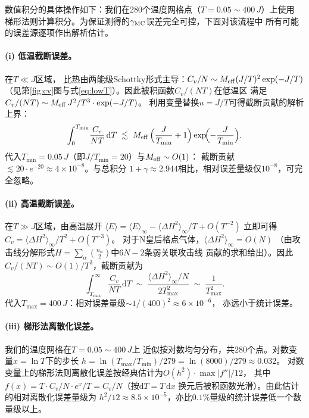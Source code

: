 数值积分的具体操作如下：我们在280个温度网格点（$T=0.05\sim400\,J$）上使用
梯形法则计算积分。为保证测得的$\gamma_{\rm MC}$误差完全可控，下面对该流程中
所有可能的误差源逐项作出解析估计。

\paragraph{(i) 低温截断误差。}在$T\ll J$区域，
比热由两能级Schottky形式主导：$C_{v}/N\sim M_{\rm eff}(J/T)^{2}\exp(-J/T)$
（见第\ref{fig:cv}图与式\ref{eq:lowT}）。因此被积函数$C_{v}/(NT)$在低温区
满足$C_{v}/(NT)\sim M_{\rm eff}\,J^{2}/T^{3}\cdot\exp(-J/T)$。
利用变量替换$u=J/T$可得截断贡献的解析上界：
%
\begin{equation}
  \int_{0}^{T_{\min}}\!\frac{C_{v}}{NT}\,\mathrm{d}T
  \;\lesssim\; M_{\rm eff}\,\Bigl(\frac{J}{T_{\min}}+1\Bigr)\exp\!\Bigl(-\frac{J}{T_{\min}}\Bigr).
\end{equation}
%
代入$T_{\min}=0.05\,J$（即$J/T_{\min}=20$）与$M_{\rm eff}\sim O(1)$：
截断贡献$\lesssim 20\cdot e^{-20}\approx 4\times 10^{-8}$。与总积分
$1+\gamma\approx 2.944$相比，相对误差量级仅$10^{-8}$，可完全忽略。

\paragraph{(ii) 高温截断误差。}在$T\gg J$区域，由高温展开
$\langle E\rangle = \langle E\rangle_{\infty} - \langle\Delta H^{2}\rangle_{\infty}/T+O(T^{-2})$
立即可得$C_{v}=\langle\Delta H^{2}\rangle_{\infty}/T^{2}+O(T^{-3})$。
对于N皇后格点气体，$\langle\Delta H^{2}\rangle_{\infty}=O(N)$
（由攻击线分解形式$H=\sum_{\alpha}\binom{n_{\alpha}}{2}$中$6N-2$条弱关联攻击线
贡献的求和给出）。因此$C_{v}/(NT)\sim O(1)/T^{3}$，截断贡献为
%
\begin{equation}
  \int_{T_{\max}}^{\infty}\!\frac{C_{v}}{NT}\,\mathrm{d}T
  \;\sim\;\frac{\langle\Delta H^{2}\rangle_{\infty}/N}{2T_{\max}^{2}}
  \;\sim\;\frac{1}{T_{\max}^{2}}.
\end{equation}
%
代入$T_{\max}=400\,J$：相对误差量级$\sim 1/(400)^{2}\approx 6\times 10^{-6}$，
亦远小于统计误差。

\paragraph{(iii) 梯形法离散化误差。}我们的温度网格在$T=0.05\sim 400\,J$上
近似按对数均匀分布，共$280$个点。对数变量$x=\ln T$下的步长
$h=\ln(T_{\max}/T_{\min})/279=\ln(8000)/279\approx 0.032$。
对数变量上的梯形法则离散化误差按经典估计为$O(h^{2})\cdot\max|f''|/12$，
其中$f(x)=T\cdot C_{v}/N\cdot e^{x}/T=C_{v}/N$（按$\mathrm{d}T=T\,\mathrm{d}x$
换元后被积函数光滑）。由此估计的相对离散化误差量级为
$h^{2}/12\approx 8.5\times 10^{-5}$，亦比$0.1\%$量级的统计误差低一个数量级以上。

